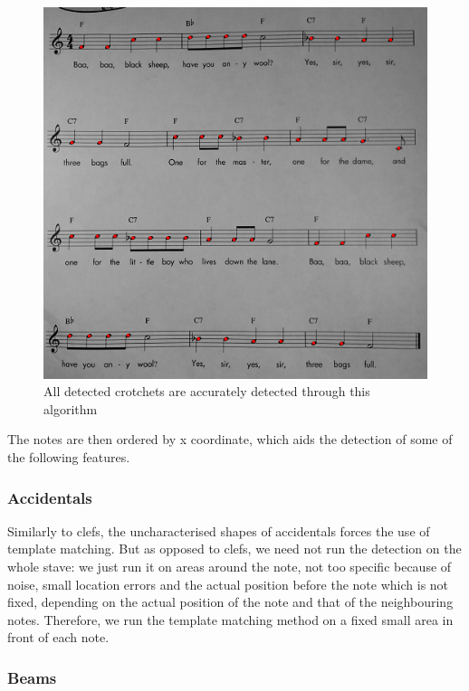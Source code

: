 \begin{figure}[ht!]
    \centering
    \includegraphics[width=1\textwidth]{./assets/crotchetsdetected.png}
    \caption{All detected crotchets are accurately detected through this algorithm}
    \label{image:crotchetsdetected}
\end{figure}

The notes are then ordered by x coordinate, which aids the detection of some of the following features.

\subsubsection{Accidentals}

Similarly to clefs, the uncharacterised shapes of accidentals forces the use of template matching. But as opposed to clefs, we need not run the detection on the whole stave: we just run it on areas around the note, not too specific because of noise, small location errors and the actual position before the note which is not fixed, depending on the actual
position of the note and that of the neighbouring notes. Therefore, we run the template matching method on a fixed small area in front of each note.

\subsubsection{Beams}

